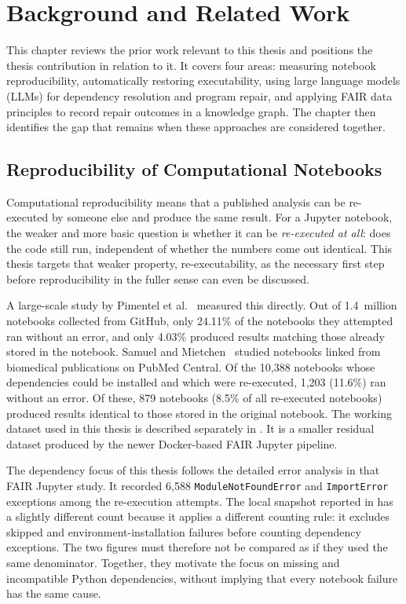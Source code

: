 \chapter{Background and Related Work}
\label{chap:related-work}

This chapter reviews the prior work relevant to this thesis and positions the
thesis contribution in relation to it. It covers four areas: measuring notebook
reproducibility, automatically restoring executability, using large language
models (LLMs) for dependency resolution and program repair, and applying FAIR
data principles to record repair outcomes in a knowledge graph. The chapter
then identifies the gap that remains when these approaches are considered
together.

\section{Reproducibility of Computational Notebooks}
\label{sec:rw-reproducibility}

Computational reproducibility means that a published analysis can be
re-executed by someone else and produce the same result. For a Jupyter
notebook, the weaker and more basic question is whether it can be
\emph{re-executed at all}: does the code still run, independent of whether
the numbers come out identical. This thesis targets that weaker property,
re-executability, as the necessary first step before reproducibility in the
fuller sense can even be discussed.

A large-scale study by Pimentel et al.~\cite{pimentel2019msr} measured
this directly. Out of 1.4~million notebooks collected from GitHub, only 24.11\% of
the notebooks they attempted ran without an error, and only 4.03\% produced
results matching those already stored in the notebook. Samuel and
Mietchen~\cite{samuel2024gigascience} studied notebooks linked from
biomedical publications on PubMed Central. Of the 10,388 notebooks whose
dependencies could be installed and which were re-executed, 1,203 (11.6\%)
ran without an error. Of these, 879 notebooks (8.5\% of all re-executed
notebooks) produced results identical to those stored in the original
notebook. The working dataset used in this thesis is described separately in
. It is a smaller residual dataset produced by the
newer Docker-based FAIR Jupyter pipeline.

The dependency focus of this thesis follows the detailed error analysis in
that FAIR Jupyter study. It recorded 6,588 \texttt{ModuleNotFoundError} and
\texttt{ImportError} exceptions among the re-execution attempts. The
local snapshot reported in  has a slightly different count
because it applies a different counting rule: it excludes skipped and
environment-installation failures before counting dependency exceptions. The
two figures must therefore not be compared as if they used the same
denominator. Together, they motivate the focus on missing and incompatible
Python dependencies, without implying that every notebook failure has the
same cause.

